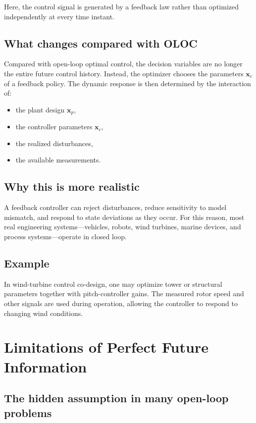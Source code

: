 \documentclass[11pt]{article}
\newcommand{\vect}[1]{\boldsymbol{#1}}
\newcommand{\xp}{\vect{x}_p}
\newcommand{\xc}{\vect{x}_c}
\begin{document}
Here, the control signal is generated by a feedback law rather than optimized independently at every time instant.

\subsection{What changes compared with OLOC}

Compared with open-loop optimal control, the decision variables are no longer the entire future control history. Instead, the optimizer chooses the parameters $\xc$ of a feedback policy. The dynamic response is then determined by the interaction of:
\begin{itemize}[leftmargin=1.4em]
  \item the plant design $\xp$,
  \item the controller parameters $\xc$,
  \item the realized disturbances,
  \item the available measurements.
\end{itemize}

\subsection{Why this is more realistic}

A feedback controller can reject disturbances, reduce sensitivity to model mismatch, and respond to state deviations as they occur. For this reason, most real engineering systems---vehicles, robots, wind turbines, marine devices, and process systems---operate in closed loop.

\subsection{Example}

In wind-turbine control co-design, one may optimize tower or structural parameters together with pitch-controller gains. The measured rotor speed and other signals are used during operation, allowing the controller to respond to changing wind conditions.

\section{Limitations of Perfect Future Information}

\subsection{The hidden assumption in many open-loop problems}
\end{document}
